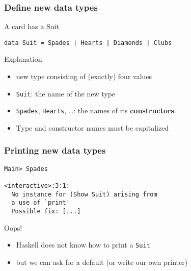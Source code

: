 \documentclass{beamer}
\begin{document}
\begin{frame}[fragile]
  \frametitle{Define new data types}
  \begin{block}{A card has a Suit}
\begin{verbatim}
data Suit = Spades | Hearts | Diamonds | Clubs
\end{verbatim}
  \end{block}
  \begin{alertblock}{Explanation}
    \begin{itemize}
    \item new type consisting of (exactly) four values
    \item  \texttt{Suit}: the name of the new type
    \item \texttt{Spades}, \texttt{Hearts}, \dots: the names of its
      \textbf{constructors}.
    \item Type and constructor names must be capitalized
    \end{itemize}
  \end{alertblock}
\end{frame}
\begin{frame}[fragile]
  \frametitle{Printing new data types}
\begin{verbatim}
Main> Spades

<interactive>:3:1:
  No instance for (Show Suit) arising from
  a use of `print'
  Possible fix: [...] 
\end{verbatim}

  \begin{alertblock}{Oops!}
    \begin{itemize}
    \item Haskell does not know how to print a \texttt{Suit}
    \item but we can ask for a default (or write our own printer)
    \end{itemize}
  \end{alertblock}
\end{frame}
\end{document}
